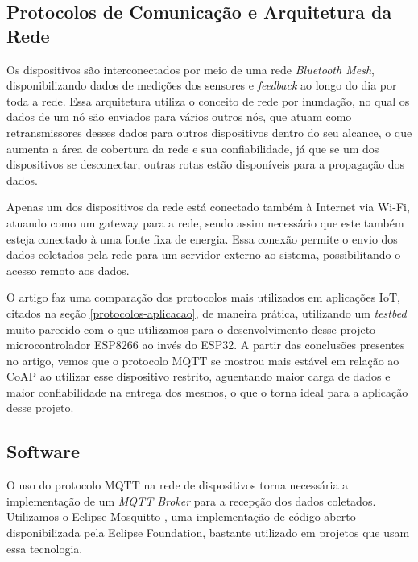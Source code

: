 \documentclass[../monografia.tex]{subfiles}
\begin{document}
\subsection{Protocolos de Comunicação e Arquitetura da Rede}

Os dispositivos são interconectados por meio de uma rede \textit{Bluetooth Mesh}, disponibilizando dados de medições dos sensores e \textit{feedback} ao longo do dia por toda a rede. Essa arquitetura utiliza o conceito de rede por inundação, no qual os dados de um nó são enviados para vários outros nós, que atuam como retransmissores desses dados para outros dispositivos dentro do seu alcance, o que aumenta a área de cobertura da rede e sua confiabilidade, já que se um dos dispositivos se desconectar, outras rotas estão disponíveis para a propagação dos dados.

Apenas um dos dispositivos da rede está conectado também à Internet via Wi-Fi, atuando como um gateway para a rede, sendo assim necessário que este também esteja conectado à uma fonte fixa de energia. Essa conexão permite o envio dos dados coletados pela rede para um servidor externo ao sistema, possibilitando o acesso remoto aos dados.

O artigo \cite{analise-protocolos-iot} faz uma comparação dos protocolos mais utilizados em aplicações IoT, citados na seção \ref{protocolos-aplicacao}, de maneira prática, utilizando um \textit{testbed} muito parecido com o que utilizamos para o desenvolvimento desse projeto --- microcontrolador ESP8266 ao invés do ESP32. A partir das conclusões presentes no artigo, vemos que o protocolo MQTT se mostrou mais estável em relação ao CoAP ao utilizar esse dispositivo restrito, aguentando maior carga de dados e maior confiabilidade na entrega dos mesmos, o que o torna ideal para a aplicação desse projeto.


\subsection{Software}

O uso do protocolo MQTT na rede de dispositivos torna necessária a implementação de um \textit{MQTT Broker} para a recepção dos dados coletados. Utilizamos o Eclipse Mosquitto \cite{mosquitto}, uma implementação de código aberto disponibilizada pela Eclipse Foundation, bastante utilizado em projetos que usam essa tecnologia.
\end{document}
